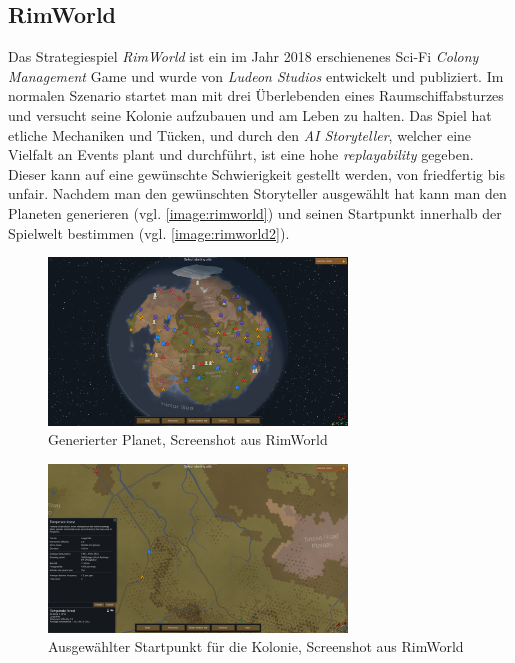 \subsection{RimWorld}
Das Strategiespiel \textit{RimWorld} ist ein im Jahr 2018 erschienenes Sci-Fi \textit{Colony Management} Game und wurde von \textit{Ludeon Studios} entwickelt und publiziert. Im normalen Szenario startet man mit drei Überlebenden eines Raumschiffabsturzes und versucht seine Kolonie aufzubauen und am Leben zu halten. Das Spiel hat etliche Mechaniken und Tücken, und durch den \textit{AI Storyteller}, welcher eine Vielfalt an Events plant und durchführt, ist eine hohe \textit{replayability} gegeben. Dieser kann auf eine gewünschte Schwierigkeit gestellt werden, von friedfertig bis unfair. Nachdem man den gewünschten Storyteller ausgewählt hat kann man den Planeten generieren (vgl. \autoref{image:rimworld}) und seinen Startpunkt innerhalb der Spielwelt bestimmen (vgl. \autoref{image:rimworld2}).

\begin{figure}
    \begin{center}
        \includegraphics[width=300px]{0.bilder/rimworld.png}
    \end{center}
    \caption{Generierter Planet, Screenshot aus RimWorld} \label{image:rimworld}
\end{figure}

\begin{figure}
    \begin{center}
        \includegraphics[width=300px]{0.bilder/rimworld2.png}
    \end{center}
    \caption{Ausgewählter Startpunkt für die Kolonie, Screenshot aus RimWorld} \label{image:rimworld2}
\end{figure}

